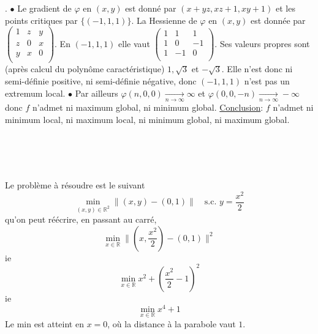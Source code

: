 \documentclass{report}
\begin{document}
. $\bullet$ Le gradient de $\varphi$ en $(x,y)$ est donné par $(x+y z,x z+1,x y+1)$ et les points critiques par $\{(-1,1,1)\}$.
La Hessienne de $\varphi$ en $(x,y)$ est donnée par $\left(
\begin{array}{ccc}
 1 & z & y \\
 z & 0 & x \\
 y & x & 0 \\
\end{array}
\right)$.\newline
En $(-1,1,1)$ elle vaut $\left(
\begin{array}{ccc}
 1 & 1 & 1 \\
 1 & 0 & -1 \\
 1 & -1 & 0 \\
\end{array}
\right)$. Ses valeurs propres sont (après calcul du polynôme caractéristique) $1,\sqrt 3$ et $-\sqrt 3$. Elle n'est donc ni semi-définie positive, ni semi-définie négative, donc $(-1,1,1)$ n'est pas un extremum local.\newline \newline
$\bullet$ Par ailleurs $\varphi( n,0,0)\xrightarrow[n\to \infty]{}\infty$ et $\varphi( 0,0,-n)\xrightarrow[n\to \infty]{}-\infty$ donc $f$ n'admet ni maximum global, ni minimum global.\newline
\newline
\underline{Conclusion}: $f$ n'admet ni minimum local, ni maximum local, ni minimum global, ni maximum global.

\subsection{} \noindent{}\\ 
\\ 
\\
\noindent Le problème à résoudre est le suivant $$ \min_{(x,y)\in \mathbb R^2} \|(x,y)-(0,1)\| \quad \text{s.c. } y=\frac{x^2}{2}$$
qu'on peut réécrire, en passant au carré, $$ \min_{x\in \mathbb R} \|(x,\frac{x^2}{2})-(0,1)\|^2 $$
ie $$ \min_{x\in \mathbb R} x^2+(\frac{x^2}{2}-1)^2 $$
ie $$ \min_{x\in \mathbb R} x^4+1 $$
Le min est atteint en $x=0$, où la distance à la parabole vaut $1$.
\end{document}
